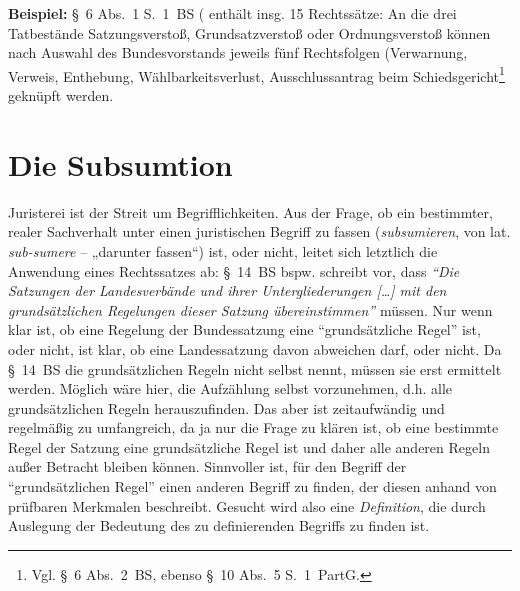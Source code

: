 \textbf{Beispiel:} \S~6 Abs.~1 S.~1~BS ( enthält insg. 15 Rechtssätze:
An die drei Tatbestände Satzungsverstoß, Grundsatzverstoß oder Ordnungsverstoß können nach Auswahl des Bundesvorstands jeweils fünf Rechtsfolgen (Verwarnung, Verweis, Enthebung, Wählbarkeitsverlust, Ausschlussantrag beim Schiedsgericht\footnote{Vgl. \S~6 Abs.~2~BS, ebenso \S~10 Abs.~5 S.~1~PartG.} geknüpft werden.


\section{Die Subsumtion}
Juristerei ist der Streit um Begrifflichkeiten.
Aus der Frage, ob ein bestimmter, realer Sachverhalt unter einen juristischen Begriff zu fassen (\emph{subsumieren}, von lat. \emph{sub-sumere} – „darunter fassen“) ist, oder nicht, leitet sich letztlich die Anwendung eines Rechtssatzes ab:
\S~14~BS bspw. schreibt vor, dass \emph{\enquote{Die Satzungen der Landesverbände und ihrer Untergliederungen […] mit den grundsätzlichen Regelungen dieser Satzung übereinstimmen}} müssen.
Nur wenn klar ist, ob eine Regelung der Bundessatzung eine \enquote{grundsätzliche Regel} ist, oder nicht, ist klar, ob eine Landessatzung davon abweichen darf, oder nicht.
Da \S~14~BS die grundsätzlichen Regeln nicht selbst nennt, müssen sie erst ermittelt werden.
Möglich wäre hier, die Aufzählung selbst vorzunehmen, d.h. alle grundsätzlichen Regeln herauszufinden.
Das aber ist zeitaufwändig und regelmäßig zu umfangreich, da ja nur die Frage zu klären ist, ob eine bestimmte Regel der Satzung eine grundsätzliche Regel ist und daher alle anderen Regeln außer Betracht bleiben können.
Sinnvoller ist, für den Begriff der \enquote{grundsätzlichen Regel} einen anderen Begriff zu finden, der diesen anhand von prüfbaren Merkmalen beschreibt.
Gesucht wird also eine \emph{Definition}, die durch Auslegung der Bedeutung des zu definierenden Begriffs zu finden ist.

